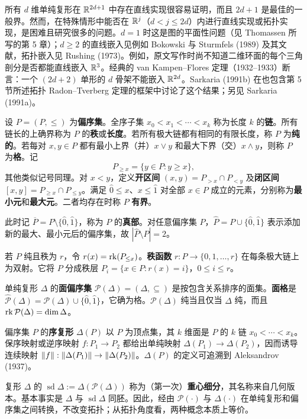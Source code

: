 所有 $d$ 维单纯复形在 $\mathbb R^{2d+1}$ 中存在直线实现很容易证明，而且 $2d+1$ 是最佳的一般界。然而，在特殊情形中能否在 $\mathbb R^j$（$d<j\le2d$）内进行直线实现或拓扑实现，是困难且研究很多的问题。$d=1$ 时这是图的平面性问题（见 Thomassen 所写的第 5 章）；$d\ge2$ 的直线嵌入见例如 Bokowski 与 Sturmfels (1989) 及其文献，拓扑嵌入见 Rushing (1973)。例如，原文写作时尚不知道二维环面的每个三角剖分是否都能直线嵌入 $\mathbb R^3$。经典的 van Kampen--Flores 定理（1932--1933）断言：一个 $(2d+2)$ 单形的 $d$ 骨架不能嵌入 $\mathbb R^{2d}$。Sarkaria (1991b) 在也包含第 5 节所述拓扑 Radon--Tverberg 定理的框架中讨论了这个结果；另见 Sarkaria (1991a)。

设 $P=(P,\le)$ 为\textbf{偏序集}。全序子集 $x_0<x_1<\cdots<x_k$ 称为长度 $k$ 的\textbf{链}。所有链长的上确界称为 $P$ 的\textbf{秩}或\textbf{长度}。若所有极大链都有相同的有限长度，称 $P$ 为\textbf{纯的}。若每对 $x,y\in P$ 都有最小上界（并）$x\vee y$ 和最大下界（交）$x\wedge y$，则称 $P$ 为\textbf{格}。记
\[
P_{\ge x}=\{y\in P:y\ge x\},
\]
其他类似记号同理。对 $x<y$，定义\textbf{开区间} $(x,y)=P_{>x}\cap P_{<y}$ 及\textbf{闭区间} $[x,y]=P_{\ge x}\cap P_{\le y}$。满足 $\hat0\le x$、$x\le\hat1$ 对全部 $x\in P$ 成立的元素，分别称为\textbf{最小元}和\textbf{最大元}。二者均存在时称 $P$ \textbf{有界}。

此时记 $\overline P=P\setminus\{\hat0,\hat1\}$，称为 $P$ 的\textbf{真部}。对任意偏序集 $P$，$\widehat P=P\cup\{\hat0,\hat1\}$ 表示添加新的最大、最小元后的偏序集，故 $|\widehat P\setminus P|=2$。

若 $P$ 纯且秩为 $r$，令 $r(x)=\operatorname{rk}(P_{\le x})$。\textbf{秩函数} $r:P\to\{0,1,\ldots,r\}$ 在每条极大链上为双射。它将 $P$ 分成秩层 $P_i=\{x\in P:r(x)=i\}$，$0\le i\le r$。

单纯复形 $\Delta$ 的\textbf{面偏序集} $\mathcal P(\Delta)=(\Delta,\subseteq)$ 是按包含关系排序的面集。\textbf{面格}是 $\widehat{\mathcal P}(\Delta)=\mathcal P(\Delta)\cup\{\hat0,\hat1\}$，它确为格。$\mathcal P(\Delta)$ 纯当且仅当 $\Delta$ 纯，而且 $\operatorname{rk}\mathcal P(\Delta)=\dim\Delta$。

偏序集 $P$ 的\textbf{序复形} $\Delta(P)$ 以 $P$ 为顶点集，其 $k$ 维面是 $P$ 的 $k$ 链 $x_0<\cdots<x_k$。保序映射或逆序映射 $f:P_1\to P_2$ 都给出单纯映射 $\Delta(P_1)\to\Delta(P_2)$，因而诱导连续映射 $\lVert f\rVert:\lVert\Delta(P_1)\rVert\to\lVert\Delta(P_2)\rVert$。$\Delta(P)$ 的定义可追溯到 Aleksandrov (1937)。

复形 $\Delta$ 的 $\operatorname{sd}\Delta:=\Delta(\mathcal P(\Delta))$ 称为（第一次）\textbf{重心细分}，其名称来自几何版本。基本事实是 $\Delta$ 与 $\operatorname{sd}\Delta$ 同胚。因此，经由 $\mathcal P(\cdot)$ 与 $\Delta(\cdot)$ 在单纯复形和偏序集之间转换，不改变拓扑；从拓扑角度看，两种概念本质上等价。

